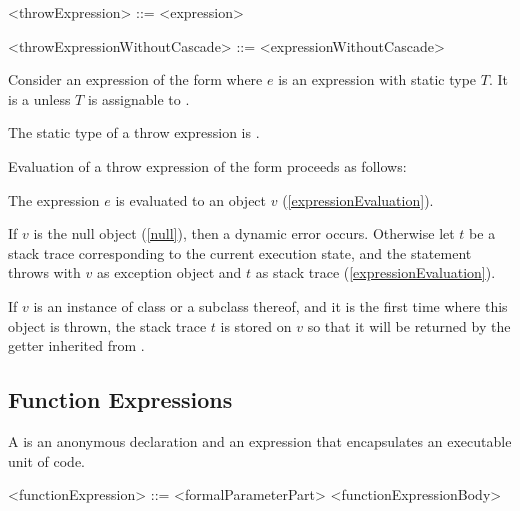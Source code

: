 \documentclass[makeidx]{article}
\begin{document}
{\begin{grammar}
<throwExpression> ::= \THROW{} <expression>

<throwExpressionWithoutCascade> ::= \THROW{} <expressionWithoutCascade>
\end{grammar}

\LMHash{}%
Consider an expression of the form 
where $e$ is an expression with static type $T$.
It is a  unless $T$ is assignable to .

\LMHash{}%
The static type of a throw expression is .

\LMHash{}%
Evaluation of a throw expression of the form 
proceeds as follows:

\LMHash{}%
The expression $e$ is evaluated to an object $v$
(\ref{expressionEvaluation}).


\LMHash{}%
If $v$ is the null object (\ref{null}), then a dynamic error occurs.
Otherwise let $t$ be a stack trace corresponding to the current execution state,
and the \THROW{} statement throws with $v$ as exception object
and $t$ as stack trace (\ref{expressionEvaluation}).

\LMHash{}%
If $v$ is an instance of class  or a subclass thereof,
and it is the first time where this  object is thrown,
the stack trace $t$ is stored on $v$ so that it will be returned
by the  getter inherited from .



\subsection{Function Expressions}

\LMHash{}%
A 
is an anonymous declaration and an expression
that encapsulates an executable unit of code.

\begin{grammar}
<functionExpression> ::= <formalParameterPart> <functionExpressionBody>


\end{grammar}}
\end{document}
